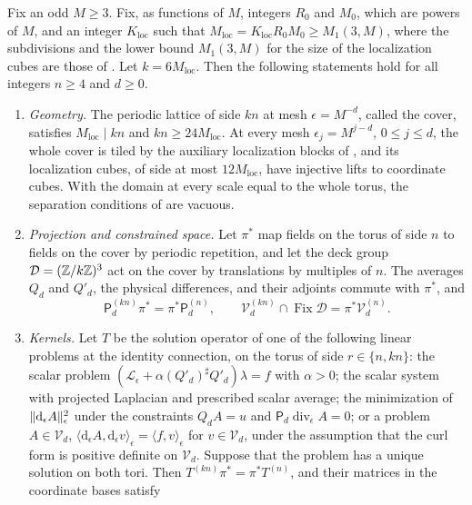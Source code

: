 \begin{lemma}\label{ch06:lem:periodic-kernel-descent}
Fix an odd $M\ge3$. Fix, as functions of $M$, integers $R_0$ and $M_0$, which are powers of $M$, and an integer $K_{\mathrm{loc}}$ such that $M_{\mathrm{loc}}=K_{\mathrm{loc}}R_0M_0\ge M_1(3,M)$, where the subdivisions and the lower bound $M_1(3,M)$ for the size of the localization cubes are those of \cite[Section~3C, pp.~408--409]{Balaban1985Background}. Let $k=6M_{\mathrm{loc}}$. Then the following statements hold for all integers $n\ge4$ and $d\ge0$.
\begin{enumerate}
\item \emph{Geometry.} The periodic lattice of side $kn$ at mesh $\epsilon=M^{-d}$, called the cover, satisfies $M_{\mathrm{loc}}\mid kn$ and $kn\ge24M_{\mathrm{loc}}$. At every mesh $\epsilon_j=M^{j-d}$, $0\le j\le d$, the whole cover is tiled by the auxiliary localization blocks of \cite[Section~3C]{Balaban1985Background}, and its localization cubes, of side at most $12M_{\mathrm{loc}}$, have injective lifts to coordinate cubes. With the domain at every scale equal to the whole torus, the separation conditions of \cite[(2.1)--(2.4), p.~224]{Balaban1984II} are vacuous.
\item \emph{Projection and constrained space.} Let $\pi^*$ map fields on the torus of side $n$ to fields on the cover by periodic repetition, and let the deck group $\mathcal D=(\mathbb Z/k\mathbb Z)^3$ act on the cover by translations by multiples of $n$. The averages $Q_d$ and $Q'_d$, the physical differences, and their adjoints commute with $\pi^*$, and
\[
 \mathsf P_d^{(kn)}\pi^*=\pi^*\mathsf P_d^{(n)},\qquad\mathcal V_d^{(kn)}\cap\operatorname{Fix}\mathcal D=\pi^*\mathcal V_d^{(n)}.
\]
\item \emph{Kernels.} Let $T$ be the solution operator of one of the following linear problems at the identity connection, on the torus of side $r\in\{n,kn\}$: the scalar problem $(\mathscr L_\epsilon+\alpha(Q'_d)^\sharp Q'_d)\lambda=f$ with $\alpha>0$; the scalar system with projected Laplacian and prescribed scalar average; the minimization of $\lVert \mathrm d_\epsilon A\rVert_\epsilon^2$ under the constraints $Q_dA=u$ and $\mathsf P_d\operatorname{div}_\epsilon A=0$; or a problem $A\in\mathcal V_d$, $\langle\mathrm d_\epsilon A,\mathrm d_\epsilon v\rangle_\epsilon=\langle f,v\rangle_\epsilon$ for $v\in\mathcal V_d$, under the assumption that the curl form is positive definite on $\mathcal V_d$. Suppose that the problem has a unique solution on both tori. Then $T^{(kn)}\pi^*=\pi^*T^{(n)}$, and their matrices in the coordinate bases satisfy

\end{enumerate}
\end{lemma}
